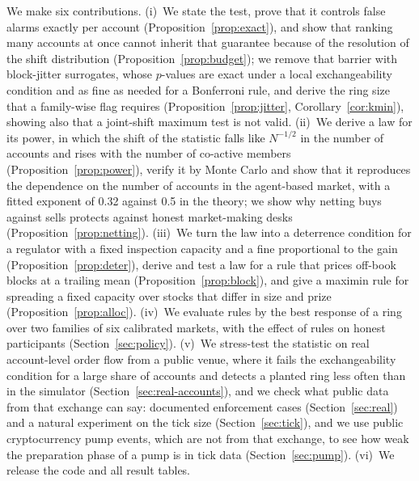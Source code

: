 We make six contributions. (i)~We state the test, prove that it controls false alarms exactly per account (Proposition~\ref{prop:exact}), and show that ranking many accounts at once cannot inherit that guarantee because of the resolution of the shift distribution (Proposition~\ref{prop:budget}); we remove that barrier with block-jitter surrogates, whose $p$-values are exact under a local exchangeability condition and as fine as needed for a Bonferroni rule, and derive the ring size that a family-wise flag requires (Proposition~\ref{prop:jitter}, Corollary~\ref{cor:kmin}), showing also that a joint-shift maximum test is not valid. (ii)~We derive a law for its power, in which the shift of the statistic falls like $N^{-1/2}$ in the number of accounts and rises with the number of co-active members (Proposition~\ref{prop:power}), verify it by Monte Carlo and show that it reproduces the dependence on the number of accounts in the agent-based market, with a fitted exponent of 0.32 against 0.5 in the theory; we show why netting buys against sells protects against honest market-making desks (Proposition~\ref{prop:netting}). (iii)~We turn the law into a deterrence condition for a regulator with a fixed inspection capacity and a fine proportional to the gain (Proposition~\ref{prop:deter}), derive and test a law for a rule that prices off-book blocks at a trailing mean (Proposition~\ref{prop:block}), and give a maximin rule for spreading a fixed capacity over stocks that differ in size and prize (Proposition~\ref{prop:alloc}). (iv)~We evaluate rules by the best response of a ring over two families of six calibrated markets, with the effect of rules on honest participants (Section~\ref{sec:policy}). (v)~We stress-test the statistic on real account-level order flow from a public venue, where it fails the exchangeability condition for a large share of accounts and detects a planted ring less often than in the simulator (Section~\ref{sec:real-accounts}), and we check what public data from that exchange can say: documented enforcement cases (Section~\ref{sec:real}) and a natural experiment on the tick size (Section~\ref{sec:tick}), and we use public cryptocurrency pump events, which are not from that exchange, to see how weak the preparation phase of a pump is in tick data (Section~\ref{sec:pump}). (vi)~We release the code and all result tables.

